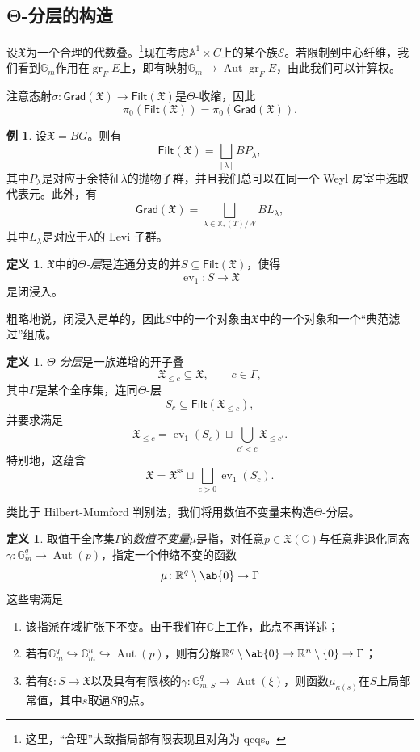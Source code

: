 \documentclass{amsart}
\theoremstyle{definition}
\newtheorem{defn}[thm]{定义}
\newtheorem{exm}[thm]{例}
\theoremstyle{remark}
\theoremstyle{plain}
\theoremstyle{definition}
\theoremstyle{remark}
\newcommand{\A}{\mathbb{A}}
\newcommand{\G}{\mathbb{G}}
\newcommand{\R}{\mathbb{R}}
\newcommand{\C}{\mathbb{C}}
\newcommand{\mc}[1]{\mathcal{#1}}
\newcommand{\mf}[1]{\mathfrak{#1}}
\newcommand{\mr}[1]{\mathrm{#1}}
\newcommand{\on}[1]{\operatorname{#1}}
\newcommand{\ms}[1]{\mathsf{#1}}
\newcommand{\1}{\mathbf{1}}
\newcommand{\2}{\mathbf{2}}
\newcommand{\3}{\mathbf{3}}
\DeclareMathOperator{\Aut}{Aut}
\DeclareMathOperator{\ev}{ev}
\begin{document}
\subsection{Θ-分层的构造}%
\label{sub:Construction of Theta-stratifications}

设\(\mf{X}\)为一个合理的代数叠。\footnote{这里，“合理”大致指局部有限表现且对角为 qcqs。}现在考虑\(\A^1 \times C\)上的某个族\(\mc{E}\)。若限制到中心纤维，我们看到\(\G_m\)作用在\(\on{gr}_F E\)上，即有映射\(\G_m \to \Aut \on{gr}_F E\)，由此我们可以计算权。

注意态射\(\sigma \colon \ms{Grad}(\mf{X}) \to \ms{Filt}(\mf{X})\)是\(\Theta\)-收缩，因此
\[ \pi_0(\ms{Filt}(\mf{X})) = \pi_0(\ms{Grad}(\mf{X})). \]

\begin{exm}
    设\(\mf{X} = BG\)。则有
    \[\ms{Filt}(\mf{X}) = \bigsqcup_{[\lambda]} B P_{\lambda}, \]
    其中\(P_{\lambda}\)是对应于余特征\(\lambda\)的抛物子群，并且我们总可以在同一个 Weyl 房室中选取代表元。此外，有
    \[ \ms{Grad}(\mf{X}) = \bigsqcup_{\lambda \in \mathbb{X}_*(T)/W} B L_{\lambda}, \]
    其中\(L_{\lambda}\)是对应于\(\lambda\)的 Levi 子群。
\end{exm}

\begin{defn}
    \(\mf{X}\)中的\textit{\(\Theta\)-层}是连通分支的并\(S \subseteq \ms{Filt}(\mf{X})\)，使得
    \[ \ev_1 \colon S \to \mf{X} \]
    是闭浸入。
\end{defn}

粗略地说，闭浸入是单的，因此\(S\)中的一个对象由\(\mf{X}\)中的一个对象和一个“典范滤过”组成。

\begin{defn}
    \textit{\(\Theta\)-分层}是一族递增的开子叠
    \[ \mf{X}_{\leq c} \subseteq \mf{X}, \qquad c \in \Gamma, \]
    其中\(\Gamma\)是某个全序集，连同\(\Theta\)-层
    \[ S_c \subseteq \ms{Filt}(\mf{X}_{\leq c}), \]
    并要求满足
    \[ \mf{X}_{\leq c} = \ev_1(S_c) \sqcup \bigcup_{c' < c} \mf{X}_{\leq c'}. \]
    特别地，这蕴含
    \[ \mf{X} = \mf{X}^{\mr{ss}} \sqcup \bigsqcup_{c > 0} \ev_1(S_c). \]
\end{defn}

类比于 Hilbert-Mumford 判别法，我们将用数值不变量来构造\(\Theta\)-分层。
\begin{defn}
    取值于全序集\(\Gamma\)的\textit{数值不变量}\(\mu\)是指，对任意\(p \in \mf{X}(\C)\)与任意非退化同态\(\gamma \colon \G_m^q \to \Aut(p)\)，指定一个伸缩不变的函数
    \[ \mu \colon \R^q \setminus \ab\{0\} \to \Gamma \]
    这些需满足
    \begin{enumerate}
        \item 该指派在域扩张下不变。由于我们在\(\C\)上工作，此点不再详述；
        \item 若有\(\G_m^q \hookrightarrow \G_m^n \hookrightarrow \Aut(p)\)，则有分解\(\R^q \setminus \ab\{0\} \to \R^n \setminus \{0\} \to \Gamma\)；
        \item 若有\(\xi \colon S \to \mf{X}\)以及具有有限核的\(\gamma \colon \G_{m, S}^q \to \Aut(\xi)\)，则函数\(\mu_{\kappa(s)}\)在\(S\)上局部常值，其中\(s\)取遍\(S\)的点。
    \end{enumerate}
\end{defn}
\end{document}
